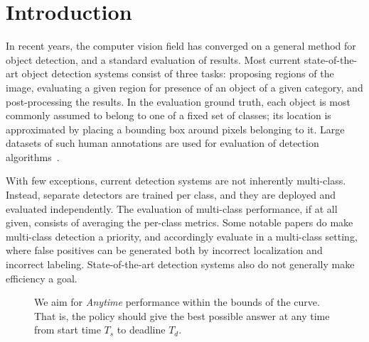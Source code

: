 \section{Introduction}

In recent years, the computer vision field has converged on a general method for object detection, and a standard evaluation of results.
Most current state-of-the-art object detection systems consist of three tasks: proposing regions of the image, evaluating a given region for presence of an object of a given category, and post-processing the results.
In the evaluation ground truth, each object is most commonly assumed to belong to one of a fixed set of classes; its location is approximated by placing a bounding box around pixels belonging to it.
Large datasets of such human annotations are used for evaluation of detection algorithms~\cite{pascal-voc-2010,imagenet_cvpr09}.

With few exceptions, current detection systems are not inherently multi-class.
Instead, separate detectors are trained per class, and they are deployed and evaluated independently.
The evaluation of multi-class performance, if at all given, consists of averaging the per-class metrics.
Some notable papers do make multi-class detection a priority, and accordingly evaluate in a multi-class setting, where false positives can be generated both by incorrect localization and incorrect labeling.
State-of-the-art detection systems also do not generally make efficiency a goal.

\begin{figure}[ht!]
  \caption{We aim for \emph{Anytime} performance within the bounds of the curve. That is, the policy should give the best possible answer at any time from start time $T_s$ to deadline $T_d$. }
  \label{fig:evaluation}
\end{figure}

